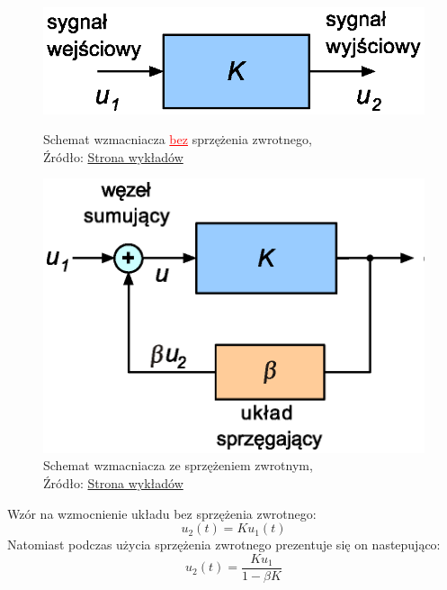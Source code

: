 \documentclass{article}
\begin{document}
      \begin{figure}[!ht]
        \begin{minipage}{.5\textwidth}
            \centering
            \includegraphics[scale=0.75]{grafiki/bez_sprzezenia.eps}
            \caption{Schemat wzmacniacza \textcolor{red}{\underline{bez}} sprzężenia zwrotnego,
            \\Źródło: \href{https://spe.if.uj.edu.pl/literatura}{Strona wykładów}}
        \end{minipage}
        \begin{minipage}{.5\textwidth}
            \centering
            \includegraphics[scale=0.75]{grafiki/z_sprzezeniem.eps} 
            \caption{Schemat wzmacniacza ze sprzężeniem zwrotnym,
            \\Źródło: \href{https://spe.if.uj.edu.pl/literatura}{Strona wykładów}}
        \end{minipage}
      \end{figure}

      Wzór na wzmocnienie układu bez sprzężenia zwrotnego:
      \begin{equation}
        u_2(t) = K u_1(t)
      \end{equation}
      Natomiast podczas użycia sprzężenia zwrotnego prezentuje się on nastepująco:
      \begin{equation}
        u_2(t) = \frac{Ku_1}{1 - \beta K }
      \end{equation}
\end{document}
